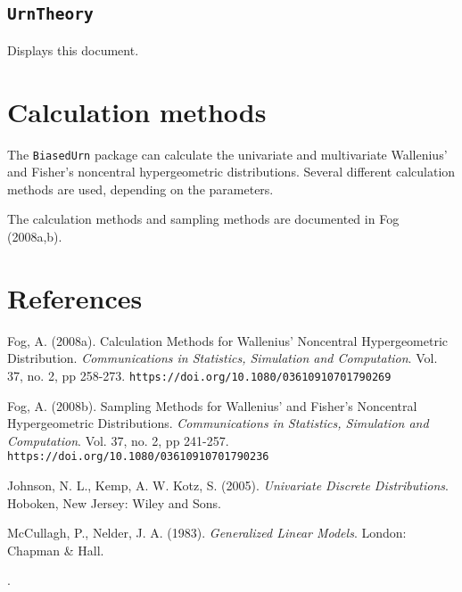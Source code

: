 \documentclass[a4paper]{article}
\begin{document}
\subsection{\tt UrnTheory}
%
Displays this document.


\section{Calculation methods}
%
The {\tt BiasedUrn} package can calculate the univariate 
and multivariate
Wallenius' and Fisher's noncentral hypergeometric distributions.
Several different calculation methods are used, depending on the 
parameters.

The calculation methods and sampling methods are documented in Fog (2008a,b).

\section{References}

\noindent Fog, A. (2008a). Calculation Methods for Wallenius' 
Noncentral Hypergeometric Distribution.
{\it Communications in Statistics, Simulation and Computation}. 
Vol. 37, no. 2, pp 258-273.
{\tt https://doi.org/10.1080/03610910701790269}

\vskip 3mm

\noindent Fog, A. (2008b). Sampling Methods for Wallenius' 
and Fisher's Noncentral Hypergeometric Distributions.
{\it Communications in Statistics, Simulation and Computation}. 
Vol. 37, no. 2, pp 241-257.
{\tt https://doi.org/10.1080/03610910701790236}

\vskip 3mm

\noindent Johnson, N. L., Kemp, A. W. Kotz, S. (2005). {\it
Univariate Discrete Distributions}. Hoboken, New Jersey: Wiley and
Sons.

\vskip 3mm

\noindent McCullagh, P., Nelder, J. A. (1983). {\it Generalized
Linear Models}. London: Chapman \& Hall.

\vskip 3mm

.
\end{document}
